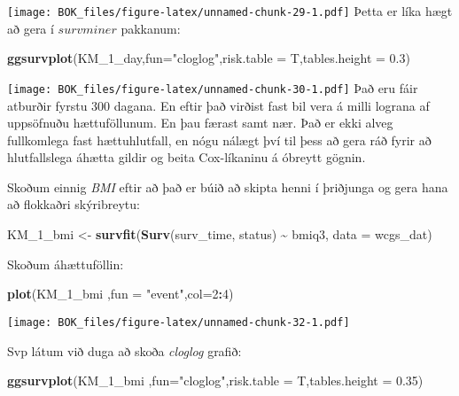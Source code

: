 \documentclass[
]{book}
\newenvironment{Shaded}{\begin{snugshade}}{\end{snugshade}}
\newcommand{\DataTypeTok}[1]{\textcolor[rgb]{0.13,0.29,0.53}{#1}}
\newcommand{\DecValTok}[1]{\textcolor[rgb]{0.00,0.00,0.81}{#1}}
\newcommand{\FloatTok}[1]{\textcolor[rgb]{0.00,0.00,0.81}{#1}}
\newcommand{\KeywordTok}[1]{\textcolor[rgb]{0.13,0.29,0.53}{\textbf{#1}}}
\newcommand{\NormalTok}[1]{#1}
\newcommand{\OperatorTok}[1]{\textcolor[rgb]{0.81,0.36,0.00}{\textbf{#1}}}
\newcommand{\StringTok}[1]{\textcolor[rgb]{0.31,0.60,0.02}{#1}}
\begin{document}
\texttt{[image: BOK\_files/figure-latex/unnamed-chunk-29-1.pdf]}
Þetta er líka hægt að gera í \(survminer\) pakkanum:

\begin{Shaded}
\begin{Highlighting}[]
\KeywordTok{ggsurvplot}\NormalTok{(KM\_}\DecValTok{1}\NormalTok{\_day,}\DataTypeTok{fun=}\StringTok{"cloglog"}\NormalTok{,}\DataTypeTok{risk.table =}\NormalTok{ T,}\DataTypeTok{tables.height =} \FloatTok{0.3}\NormalTok{)}
\end{Highlighting}
\end{Shaded}

\texttt{[image: BOK\_files/figure-latex/unnamed-chunk-30-1.pdf]}
Það eru fáir atburðir fyrstu 300 dagana. En eftir það virðist fast bil vera á milli lograna af uppsöfnuðu hættuföllunum. En þau færast samt nær. Það er ekki alveg fullkomlega fast hættuhlutfall, en nógu nálægt því til þess að gera ráð fyrir að hlutfallslega áhætta gildir og beita Cox-líkaninu á óbreytt gögnin.

Skoðum einnig \emph{BMI} eftir að það er búið að skipta henni í þriðjunga og gera hana að flokkaðri skýribreytu:

\begin{Shaded}
\begin{Highlighting}[]
\NormalTok{KM\_}\DecValTok{1}\NormalTok{\_bmi <{-}}\StringTok{ }\KeywordTok{survfit}\NormalTok{(}\KeywordTok{Surv}\NormalTok{(surv\_time, status) }\OperatorTok{\textasciitilde{}}\StringTok{ }\NormalTok{bmiq3, }\DataTypeTok{data =}\NormalTok{ wcgs\_dat)}
\end{Highlighting}
\end{Shaded}

Skoðum áhættuföllin:

\begin{Shaded}
\begin{Highlighting}[]
\KeywordTok{plot}\NormalTok{(KM\_}\DecValTok{1}\NormalTok{\_bmi ,}\DataTypeTok{fun =} \StringTok{"event"}\NormalTok{,}\DataTypeTok{col=}\DecValTok{2}\OperatorTok{:}\DecValTok{4}\NormalTok{)}
\end{Highlighting}
\end{Shaded}

\texttt{[image: BOK\_files/figure-latex/unnamed-chunk-32-1.pdf]}

Svp látum við duga að skoða \emph{cloglog} grafið:

\begin{Shaded}
\begin{Highlighting}[]
\KeywordTok{ggsurvplot}\NormalTok{(KM\_}\DecValTok{1}\NormalTok{\_bmi ,}\DataTypeTok{fun=}\StringTok{"cloglog"}\NormalTok{,}\DataTypeTok{risk.table =}\NormalTok{ T,}\DataTypeTok{tables.height =} \FloatTok{0.35}\NormalTok{)}
\end{Highlighting}
\end{Shaded}
\end{document}
